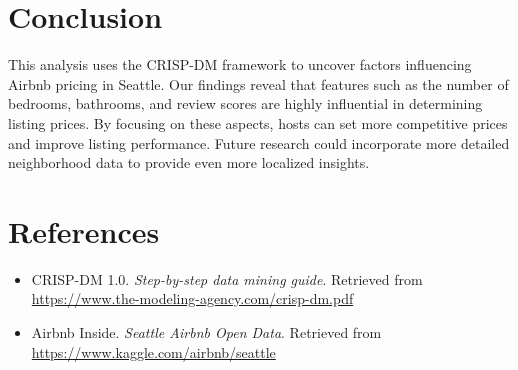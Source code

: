 \documentclass[12pt]{article}
\begin{document}
\section{Conclusion}
This analysis uses the CRISP-DM framework to uncover factors influencing Airbnb pricing in Seattle. Our findings reveal that features such as the number of bedrooms, bathrooms, and review scores are highly influential in determining listing prices. By focusing on these aspects, hosts can set more competitive prices and improve listing performance. Future research could incorporate more detailed neighborhood data to provide even more localized insights.

\section{References}
\begin{itemize}
    \item CRISP-DM 1.0. \textit{Step-by-step data mining guide}. Retrieved from \url{https://www.the-modeling-agency.com/crisp-dm.pdf}
    \item Airbnb Inside. \textit{Seattle Airbnb Open Data}. Retrieved from \url{https://www.kaggle.com/airbnb/seattle}
\end{itemize}
\end{document}
